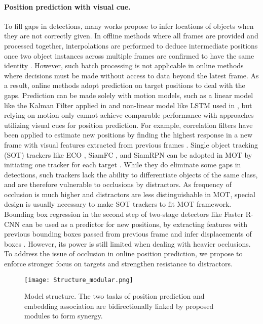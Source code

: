 \documentclass[final]{cvpr}
\begin{document}
\paragraph{Position prediction with visual cue.}
To fill gaps in detections, many works propose to infer locations of objects when they are not correctly given. In offline methods where all frames are provided and processed together, interpolations are performed to deduce intermediate positions once two object instances across multiple frames are confirmed to have the same identity \cite{Shen2018, Braso2019, Peng2020a, Hornakova2020,Wang_TIP_2017,Lan_TIP_2018,Ren_TIP_2021, He_TIP_2016, Shen_TC_2018}. However, such batch processing is not applicable in online methods where decisions must be made without access to data beyond the latest frame. As a result, online methods adopt prediction on target positions to deal with the gaps. Prediction can be made solely with motion models, such as a linear model like the Kalman Filter applied in \cite{Bewley2016, Wang2017} and non-linear model like LSTM used in \cite{Milan2016, Alahi2016, Fernando2018, Zhang2019}, but relying on motion only cannot achieve comparable performance with approaches utilizing visual cues for position prediction. For example, correlation filters have been applied to estimate new positions by finding the highest response in a new frame with visual features extracted from previous frames \cite{Wang2017, Feichtenhofer2017, Zhao2018c}. Single object tracking (SOT) trackers like ECO \cite{Danelljan2017}, SiamFC \cite{Bertinetto}, and SiamRPN \cite{Li2018} can be adopted in MOT by initiating one tracker for each target \cite{Zhu2018, Feng2019, Chu2019}. While they do eliminate some gaps in detections, such trackers lack the ability to differentiate objects of the same class, and are therefore vulnerable to occlusions by distractors. As frequency of occlusion is much higher and distractors are less distinguishable in MOT, special design is usually necessary to make SOT trackers to fit MOT framework. Bounding box regression in the second step of two-stage detectors like Faster R-CNN \cite{Ren2015} can be used as a predictor for new positions, by extracting features with previous bounding boxes passed from previous frame and infer displacements of boxes \cite{Bergmann2019a}. However, its power is still limited when dealing with heavier occlusions. To address the issue of occlusion in online position prediction, we propose to enforce stronger focus on targets and strengthen resistance to distractors.

\begin{figure*}[t]
\begin{center}
    \texttt{[image: Structure\_modular.png]}
\end{center}
   \caption{Model structure. The two tasks of position prediction and embedding association are bidirectionally linked by proposed modules to form synergy.}
\label{fig:structure}
\end{figure*}
\end{document}
